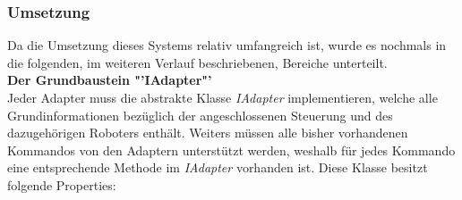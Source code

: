 \subsubsection{Umsetzung}
Da die Umsetzung dieses Systems relativ umfangreich ist, wurde es nochmals in die folgenden, im weiteren Verlauf beschriebenen, Bereiche unterteilt.\\
\newpage
\textbf{Der Grundbaustein "'IAdapter"'}\\
Jeder Adapter muss die abstrakte Klasse \textit{IAdapter} implementieren, welche alle Grundinformationen bezüglich der angeschlossenen Steuerung und des dazugehörigen Roboters enthält. Weiters müssen alle bisher vorhandenen Kommandos von den Adaptern unterstützt werden, weshalb für jedes Kommando eine entsprechende Methode im \textit{IAdapter} vorhanden ist. Diese Klasse besitzt folgende Properties:
